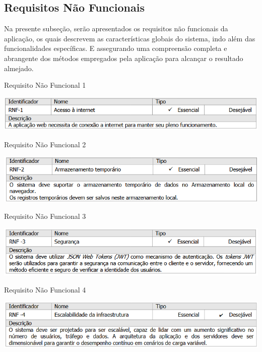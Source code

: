 \subsection{Requisitos Não Funcionais}
Na presente subseção, serão apresentados os requisitos não funcionais da aplicação, os quais descrevem as características globais do sistema, indo além das funcionalidades específicas.
E assegurando uma compreensão completa e abrangente dos métodos empregados pela aplicação para alcançar o resultado almejado.

\begin{table}[H]
    \caption{Requisito Não Funcional 1}\label{tab:rnf1}
    \centering
    \includegraphics[scale=0.8]{imagens/rnf1.png}
\end{table}
\begin{table}[H]
    \caption{Requisito Não Funcional 2}\label{tab:rnf2}
    \centering
    \includegraphics[scale=0.8]{imagens/rnf2.png}
\end{table}
\begin{table}[H]
    \caption{Requisito Não Funcional 3}\label{tab:rnf3}
    \centering
    \includegraphics[scale=0.8]{imagens/rnf3.png}
\end{table}
\begin{table}[H]
    \caption{Requisito Não Funcional 4}\label{tab:rnf4}
    \centering
    \includegraphics[scale=0.73]{imagens/rnf4.png}
\end{table}
